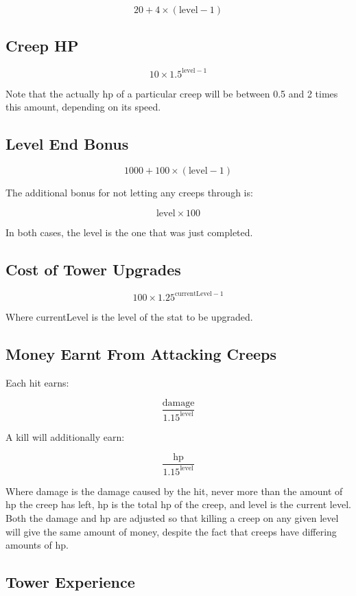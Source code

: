 \documentclass[a4paper,11pt]{article}
\begin{document}
\[20 + 4 \times \left( \mathrm{level} - 1 \right)\]

\subsection{Creep HP}

\[10 \times 1.5^{\mathrm{level} - 1}\]

Note that the actually hp of a particular creep will be between 0.5 and 2 times this amount, depending on its speed.

\subsection{Level End Bonus}

\[1000 + 100 \times \left( \mathrm{level} - 1 \right)\]

The additional bonus for not letting any creeps through is:

\[\mathrm{level} \times 100\]

In both cases, the level is the one that was just completed.

\subsection{Cost of Tower Upgrades}

\[100 \times 1.25^{\mathrm{currentLevel} - 1}\]

Where currentLevel is the level of the stat to be upgraded.

\subsection{Money Earnt From Attacking Creeps}

Each hit earns:

\[\frac{\mathrm{damage}}{1.15^{\mathrm{level}}}\]

A kill will additionally earn:

\[\frac{\mathrm{hp}}{1.15^{\mathrm{level}}}\]

Where damage is the damage caused by the hit, never more than the amount of hp the creep has left, hp is the total hp of the creep, and level is the current level. Both the damage and hp are adjusted so that killing a creep on any given level will give the same amount of money, despite the fact that creeps have differing amounts of hp.

\subsection{Tower Experience}
\end{document}
